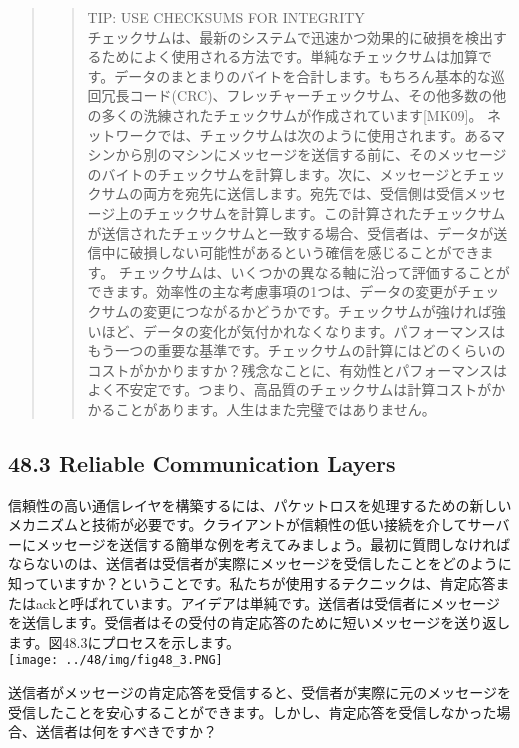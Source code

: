 \begin{quote}
\begin{quote}
TIP: USE CHECKSUMS FOR INTEGRITY\\
チェックサムは、最新のシステムで迅速かつ効果的に破損を検出するためによく使用される方法です。単純なチェックサムは加算です。データのまとまりのバイトを合計します。もちろん基本的な巡回冗長コード(CRC)、フレッチャーチェックサム、その他多数の他の多くの洗練されたチェックサムが作成されています{[}MK09{]}。
ネットワークでは、チェックサムは次のように使用されます。あるマシンから別のマシンにメッセージを送信する前に、そのメッセージのバイトのチェックサムを計算します。次に、メッセージとチェックサムの両方を宛先に送信します。宛先では、受信側は受信メッセージ上のチェックサムを計算します。この計算されたチェックサムが送信されたチェックサムと一致する場合、受信者は、データが送信中に破損しない可能性があるという確信を感じることができます。
チェックサムは、いくつかの異なる軸に沿って評価することができます。効率性の主な考慮事項の1つは、データの変更がチェックサムの変更につながるかどうかです。チェックサムが強ければ強いほど、データの変化が気付かれなくなります。パフォーマンスはもう一つの重要な基準です。チェックサムの計算にはどのくらいのコストがかかりますか？残念なことに、有効性とパフォーマンスはよく不安定です。つまり、高品質のチェックサムは計算コストがかかることがあります。人生はまた完璧ではありません。
\end{quote}
\end{quote}

\hypertarget{reliable-communication-layers}{%
\subsection*{48.3 Reliable Communication
Layers}\label{reliable-communication-layers}}

信頼性の高い通信レイヤを構築するには、パケットロスを処理するための新しいメカニズムと技術が必要です。クライアントが信頼性の低い接続を介してサーバーにメッセージを送信する簡単な例を考えてみましょう。最初に質問しなければならないのは、送信者は受信者が実際にメッセージを受信したことをどのように知っていますか？ということです。私たちが使用するテクニックは、肯定応答またはackと呼ばれています。アイデアは単純です。送信者は受信者にメッセージを送信します。受信者はその受付の肯定応答のために短いメッセージを送り返します。図48.3にプロセスを示します。\\
\texttt{[image: ../48/img/fig48\_3.PNG]}

送信者がメッセージの肯定応答を受信すると、受信者が実際に元のメッセージを受信したことを安心することができます。しかし、肯定応答を受信しなかった場合、送信者は何をすべきですか？

